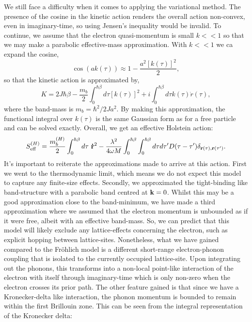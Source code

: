 We still face a difficulty when it comes to applying the variational method. The presence of the cosine in the kinetic action renders the overall action non-convex, even in imaginary-time, so using Jensen's inequality would be invalid. To continue, we assume that the electron quasi-momentum is small $k << 1$ so that we may make a parabolic effective-mass approximation. With $k << 1$ we ca expand the cosine,
\begin{equation}
    \cos(a k(\tau)) \approx 1 - \frac{a^2 [k(\tau)]^2}{2} ,
\end{equation}
so that the kinetic action is approximated by,
\begin{equation}
    K = 2 J \hbar \beta - \frac{m_b}{2} \int_0^{\hbar\beta} d\tau \left[k(\tau)\right]^2 + i \int_0^{\hbar\beta} d\tau k(\tau) \Dot{r}(\tau) ,
\end{equation}
where the band-mass is $m_b = \hbar^2 / 2 J a^2$. By making this approximation, the functional integral over $k(\tau)$ is the same Gaussian form as for a free particle and can be solved exactly. Overall, we get an effective Holstein action:
\begin{equation}
    S_{\text{eff}}^{(H)} = \frac{m^{(H)}_b}{2} \int_0^{\hbar\beta} d\tau\ \vb{\Dot{r}}^2 - \frac{\lambda^2}{4 \omega M} \int_0^{\hbar\beta} \int_0^{\hbar\beta} d\tau d\tau' D(\tau - \tau') \delta_{\vb{r}(\tau), \vb{r}(\tau')} .
\end{equation}
It's important to reiterate the approximations made to arrive at this action. First we went to the thermodynamic limit, which means we do not expect this model to capture any finite-size effects. Secondly, we approximated the tight-binding like band-structure with a parabolic band centred at $\vb{k} = 0$. Whilst this may be a good approximation close to the band-minimum, we have made a third approximation where we assumed that the electron momentum is unbounded as if it were free, albeit with an effective band-mass. So, we can predict that this model will likely exclude any lattice-effects concerning the electron, such as explicit hopping between lattice-sites. Nonetheless, what we have gained compared to the Fr\"ohlich model is a different short-range electron-phonon coupling that is isolated to the currently occupied lattice-site. Upon integrating out the phonons, this transforms into a non-local point-like interaction of the electron with itself through imaginary-time which is only non-zero when the electron crosses its prior path. The other feature gained is that since we have a Kronecker-delta like interaction, the phonon momentum is bounded to remain within the first Brillouin zone. This can be seen from the integral representation of the Kronecker delta:
